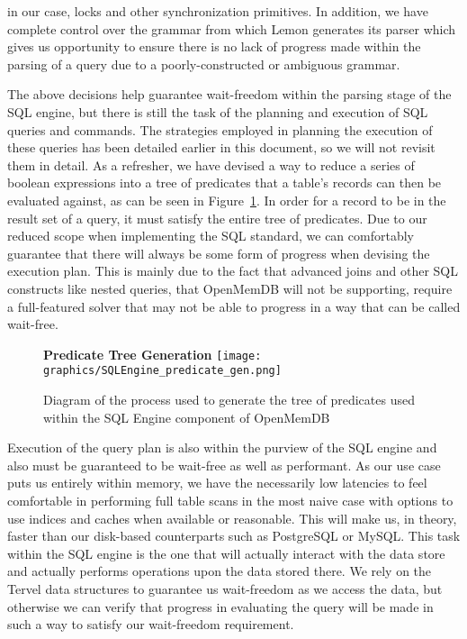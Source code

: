 \documentclass[letterpaper, 12pt]{article}
\begin{document}
  in our case, locks and other synchronization primitives. In addition, we have complete control over
  the grammar from which Lemon generates its parser which gives us opportunity to ensure there
  is no lack of progress made within the parsing of a query due to a poorly-constructed or ambiguous
  grammar.
  \par\vspace{\baselineskip}
  The above decisions help guarantee wait-freedom within the parsing stage of the SQL engine, but there
  is still the task of the planning and execution of SQL queries and commands. The strategies employed in
  planning the execution of these queries has been detailed earlier in this document, so we will not
  revisit them in detail. As a refresher, we have devised a way to reduce a series of boolean expressions
  into a tree of predicates that a table's records can then be evaluated against, as can be seen in 
  Figure~\ref{fig:sqlengine_pred_gen}. In order for a record to be in the result set of a query, it must 
  satisfy the entire tree of predicates. Due to our reduced scope when implementing the SQL standard, we 
  can comfortably guarantee that there will always be some form of progress when devising the execution 
  plan. This is mainly due to the fact that advanced joins and other SQL constructs like nested queries, 
  that OpenMemDB will not be supporting, require a full-featured solver that may not be able to progress 
  in a way that can be called wait-free.
  \par\vspace{\baselineskip}
  \begin{figure}
   \centering
   \textbf{Predicate Tree Generation}
   \texttt{[image: graphics/SQLEngine\_predicate\_gen.png]}
   \caption{Diagram of the process used to generate the tree of predicates
	    used within the SQL Engine component of OpenMemDB}
    \label{fig:sqlengine_pred_gen}
  \end{figure}
  \par\vspace{\baselineskip}
  Execution of the query plan is also within the purview of the SQL engine and also must be guaranteed to be
  wait-free as well as performant. As our use case puts us entirely within memory, we have the necessarily low
  latencies to feel comfortable in performing full table scans in the most naive case with options to
  use indices and caches when available or reasonable. This will make us, in theory, faster than our disk-based
  counterparts such as PostgreSQL or MySQL. This task within the SQL engine is the one that will actually
  interact with the data store and actually performs operations upon the data stored there. We rely on the Tervel
  data structures to guarantee us wait-freedom as we access the data, but otherwise we can verify that
  progress in evaluating the query will be made in such a way to satisfy our wait-freedom requirement.
  \par\vspace{\baselineskip}
\end{document}

